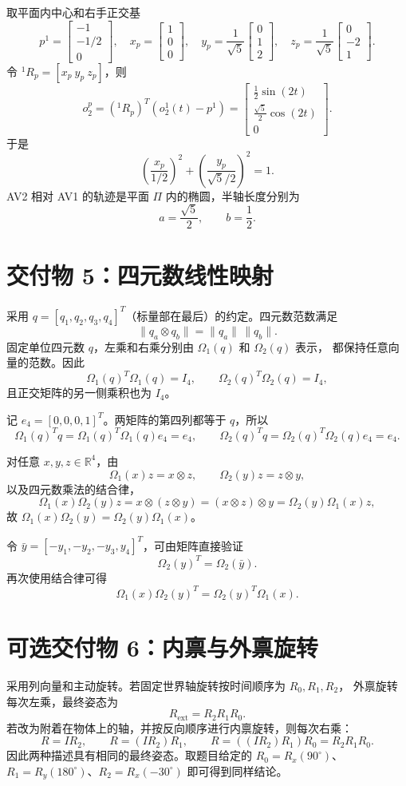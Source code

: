 \documentclass[UTF8,a4paper,11pt]{ctexart}
\newcommand{\R}{\mathbb{R}}
\newcommand{\oz}{o_2^1(t)}
\begin{document}
取平面内中心和右手正交基
\[
p^1=\begin{bmatrix}-1\\-1/2\\0\end{bmatrix},\quad
x_p=\begin{bmatrix}1\\0\\0\end{bmatrix},\quad
y_p=\frac1{\sqrt5}\begin{bmatrix}0\\1\\2\end{bmatrix},\quad
z_p=\frac1{\sqrt5}\begin{bmatrix}0\\-2\\1\end{bmatrix}.
\]
令 \( {}^1R_p=[x_p\ y_p\ z_p] \)，则
\[
o_2^p=({}^1R_p)^T(\oz-p^1)
=\begin{bmatrix}
\frac12\sin(2t)\\[2pt]
\frac{\sqrt5}{2}\cos(2t)\\[2pt]
0
\end{bmatrix}.
\]
于是
\[
\left(\frac{x_p}{1/2}\right)^2+
\left(\frac{y_p}{\sqrt5/2}\right)^2=1.
\]
AV2 相对 AV1 的轨迹是平面 $\Pi$ 内的椭圆，半轴长度分别为
\[
a=\frac{\sqrt5}{2},\qquad b=\frac12.
\]

\section{交付物 5：四元数线性映射}

采用 $q=[q_1,q_2,q_3,q_4]^T$（标量部在最后）的约定。四元数范数满足
\[
\|q_a\otimes q_b\|=\|q_a\|\,\|q_b\|.
\]
固定单位四元数 $q$，左乘和右乘分别由 $\Omega_1(q)$ 和 $\Omega_2(q)$ 表示，
都保持任意向量的范数。因此
\[
\Omega_1(q)^T\Omega_1(q)=I_4,\qquad
\Omega_2(q)^T\Omega_2(q)=I_4,
\]
且正交矩阵的另一侧乘积也为 $I_4$。

记 $e_4=[0,0,0,1]^T$。两矩阵的第四列都等于 $q$，所以
\[
\Omega_1(q)^Tq=\Omega_1(q)^T\Omega_1(q)e_4=e_4,\qquad
\Omega_2(q)^Tq=\Omega_2(q)^T\Omega_2(q)e_4=e_4.
\]

对任意 $x,y,z\in\R^4$，由
\[
\Omega_1(x)z=x\otimes z,\qquad \Omega_2(y)z=z\otimes y,
\]
以及四元数乘法的结合律，
\[
\Omega_1(x)\Omega_2(y)z=x\otimes(z\otimes y)
=(x\otimes z)\otimes y=\Omega_2(y)\Omega_1(x)z,
\]
故 $\Omega_1(x)\Omega_2(y)=\Omega_2(y)\Omega_1(x)$。

令 $\bar y=[-y_1,-y_2,-y_3,y_4]^T$，可由矩阵直接验证
\[
\Omega_2(y)^T=\Omega_2(\bar y).
\]
再次使用结合律可得
\[
\Omega_1(x)\Omega_2(y)^T=\Omega_2(y)^T\Omega_1(x).
\]

\section{可选交付物 6：内禀与外禀旋转}

采用列向量和主动旋转。若固定世界轴旋转按时间顺序为 $R_0,R_1,R_2$，
外禀旋转每次左乘，最终姿态为
\[
R_{\mathrm{ext}}=R_2R_1R_0.
\]
若改为附着在物体上的轴，并按反向顺序进行内禀旋转，则每次右乘：
\[
R=IR_2,\qquad R=(IR_2)R_1,\qquad
R=((IR_2)R_1)R_0=R_2R_1R_0.
\]
因此两种描述具有相同的最终姿态。取题目给定的
$R_0=R_x(90^\circ)$、$R_1=R_y(180^\circ)$、$R_2=R_x(-30^\circ)$
即可得到同样结论。
\end{document}
